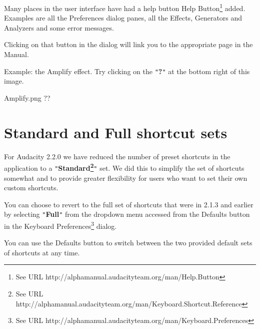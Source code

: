 Many places in the user interface have had a help button Help Button\footnote{See URL http://alphamanual.audacityteam.org/man/Help.Button} added. Examples are all the Preferences dialog panes, all the Effects, Generators and Analyzers and some error messages.

Clicking on that button in the dialog will link you to the appropriate page in the Manual.


Example:
 the Amplify effect.  Try clicking on the \texttt{{}"{}}\textbf{?}\texttt{{}"{}} at the bottom right of this image.




Amplify.png
??




\section{
Standard and Full shortcut sets
}


For Audacity 2.2.0 we have reduced the number of preset shortcuts in the application to a \texttt{{}"{}}\textbf{Standard\footnote{See URL http://alphamanual.audacityteam.org/man/Keyboard.Shortcut.Reference}}\texttt{{}"{}} set.  We did this to simplify the set of shortcuts somewhat and to provide greater flexibility for users who want to set their own custom shortcuts.

You can choose to revert to the full set of shortcuts that were in 2.1.3 and earlier by selecting \texttt{{}"{}}\textbf{Full}\texttt{{}"{}} from the dropdown menu accessed from the 
Defaults
 button in the Keyboard Preferences\footnote{See URL http://alphamanual.audacityteam.org/man/Keyboard.Preferences} dialog.

You can use the 
Defaults
 button to switch between the two provided default sets of shortcuts at any time.




